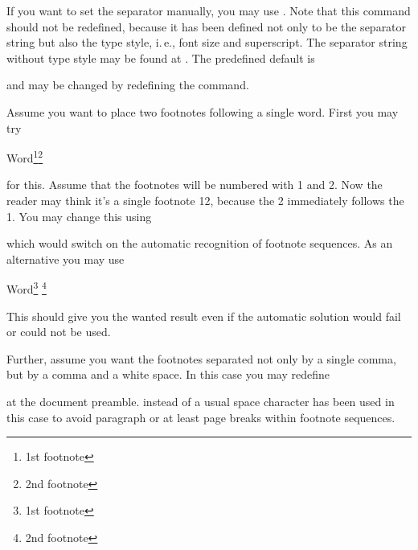 If you want to set the separator manually, you may use
. Note that this command should not be
redefined, because it has been defined not only to be the separator string but
also the type style, i.\,e., font size and superscript. The separator string
without type style may be found at . The
predefined default is
\begin{lstcode}[belowskip=\dp\strutbox]
  \newcommand*{\multfootsep}{,}
\end{lstcode}
and may be changed by redefining the command.

\ifCommonscrlttr\else
\begin{Example}
  \label{desc:maincls.cmd.footnote.example}%
  Assume you want to place two footnotes following a single word. First you may try
\begin{lstcode}
  Word\footnote{1st footnote}\footnote{2nd footnote}
\end{lstcode}
  for this. Assume that the footnotes will be numbered with 1 and 2. Now the
  reader may think it's a single footnote 12, because the 2
  immediately follows the 1. You may change this using
\begin{lstcode}
\end{lstcode}
  which would switch on the automatic recognition of footnote sequences. As an
  alternative you may use
\begin{lstcode}
  Word\footnote{1st footnote}%
  \multiplefootnoteseparator
  \footnote{2nd footnote}
\end{lstcode}
  This should give you the wanted result even if the automatic solution would
  fail or could not be used.

  Further, assume you want the footnotes separated not only by a single
  comma, but by a comma and a white space. In this case you may redefine
\begin{lstcode}
  \renewcommand*{\multfootsep}{,\nobreakspace}
\end{lstcode}
  at the document preamble. 
  instead of a usual space character has been used in this case to avoid
  paragraph or at least page breaks within footnote sequences.
\end{Example}%
\fi%
%
%
%
%
%
%
\fi %


